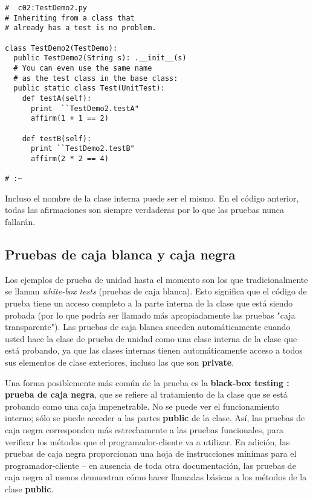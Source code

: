 \begin{lstlisting}
#  c02:TestDemo2.py 
# Inheriting from a class that  
# already has a test is no problem. 

class TestDemo2(TestDemo): 
  public TestDemo2(String s): .__init__(s)  
  # You can even use the same name  
  # as the test class in the base class: 
  public static class Test(UnitTest): 
    def testA(self): 
      print  ``TestDemo2.testA"
      affirm(1 + 1 == 2) 
      
    def testB(self): 
      print ``TestDemo2.testB" 
      affirm(2 * 2 == 4) 
      
# :~ 
\end{lstlisting}

Incluso el nombre de la clase interna puede ser el mismo. En el código anterior, todas las afirmaciones son siempre verdaderas por lo que las pruebas nunca fallarán.

\subsection*{Pruebas de caja blanca y caja negra}
\label{subsec:pdcbycn}

Los ejemplos de prueba de unidad hasta el momento son los que tradicionalmente se llaman \textit{white-box tests} (pruebas de caja blanca). Esto significa que el código de prueba tiene un acceso completo a la parte interna de la clase que está siendo probada 
(por lo que podría ser llamado más apropiadamente las pruebas "caja transparente"). Las pruebas de caja blanca suceden automáticamente cuando usted hace la clase de prueba de unidad como una clase interna de la clase que está probando, ya que las clases internas tienen automáticamente acceso a todos sus elementos de clase exteriores, incluso las que son \textbf{private}.   \newline

Una forma posiblemente más común de la prueba es la \textbf{black-box testing :  prueba de caja negra}, que se refiere al tratamiento de la clase que se está probando como una caja impenetrable. No se puede ver el funcionamiento interno; sólo se puede acceder a las partes \textbf{public}  de la clase. Así, las pruebas de caja negra corresponden más estrechamente a las pruebas funcionales, para verificar los métodos que el programador-cliente va a utilizar. En adición, las pruebas de caja negra proporcionan una hoja de instrucciones mínimas para el programador-cliente  – en ausencia de toda otra documentación, las pruebas de caja negra al menos demuestran cómo hacer llamadas básicas a los métodos de la clase \textbf{public}.    \newline

